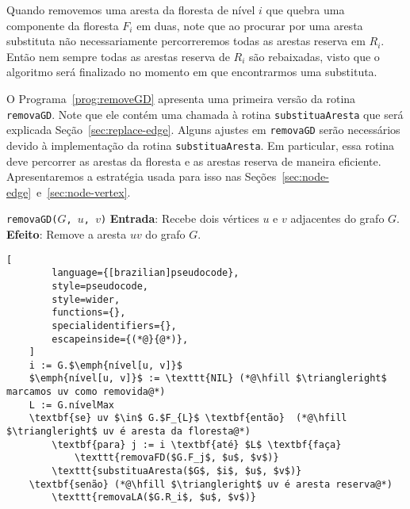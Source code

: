 Quando removemos uma aresta da floresta de nível $i$ que quebra uma componente da floresta $F_i$ em duas, note que ao procurar por uma aresta substituta não necessariamente percorreremos todas as arestas reserva em $R_i$. Então nem sempre todas as arestas reserva de $R_i$ são rebaixadas, visto que o algoritmo será finalizado no momento em que encontrarmos uma substituta.

O Programa~\ref{prog:removeGD} apresenta uma primeira versão da rotina \texttt{removaGD}. Note que ele contém uma chamada à rotina \texttt{substituaAresta} que será explicada Seção~\ref{sec:replace-edge}. Alguns ajustes em \texttt{removaGD} serão necessários devido à implementação da rotina \texttt{substituaAresta}. 
Em particular, essa rotina deve percorrer as arestas da floresta e as arestas reserva de maneira eficiente. Apresentaremos a estratégia usada para isso nas Seções~\ref{sec:node-edge}~e~\ref{sec:node-vertex}.

\begin{programruledcaption}{\texttt{removaGD($G$, $u$, $v$)} \label{prog:removeGD}}
    \noindent\textbf{Entrada}: Recebe dois vértices $u$ e $v$ adjacentes do grafo $G$. \\
    \noindent\textbf{Efeito}: Remove a aresta $uv$ do grafo $G$. 
    \vspace{-0.5\baselineskip}
    \begin{lstlisting}[
        language={[brazilian]pseudocode},
        style=pseudocode,
        style=wider,
        functions={},
        specialidentifiers={},
        escapeinside={(*@}{@*)},
    ]
    i := G.$\emph{nível[u, v]}$
    $\emph{nível[u, v]}$ := \texttt{NIL} (*@\hfill $\triangleright$ marcamos uv como removida@*)
    L := G.nívelMax
    \textbf{se} uv $\in$ G.$F_{L}$ \textbf{então}  (*@\hfill $\triangleright$ uv é aresta da floresta@*)
        \textbf{para} j := i \textbf{até} $L$ \textbf{faça}
            \texttt{removaFD($G.F_j$, $u$, $v$)}
        \texttt{substituaAresta($G$, $i$, $u$, $v$)}
    \textbf{senão} (*@\hfill $\triangleright$ uv é aresta reserva@*)
        \texttt{removaLA($G.R_i$, $u$, $v$)}
    \end{lstlisting}
    \vspace{-0.5\baselineskip}
\end{programruledcaption}









































